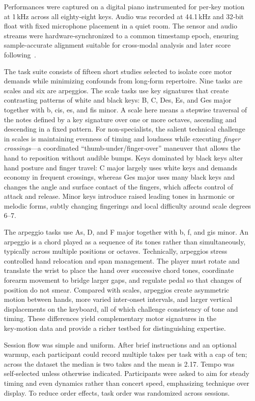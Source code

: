 \documentclass[sigconf,review,anonymous]{acmart}
\begin{document}
Performances were captured on a digital piano instrumented for per‑key motion at 1\,kHz across all eighty‑eight keys. Audio was recorded at 44.1\,kHz and 32‑bit float with fixed microphone placement in a quiet room. The sensor and audio streams were hardware‑synchronized to a common timestamp epoch, ensuring sample‑accurate alignment suitable for cross‑modal analysis and later score following~\cite{nakamura2016}.

The task suite consists of fifteen short studies selected to isolate core motor demands while minimizing confounds from long‑form repertoire. Nine tasks are scales and six are arpeggios. The scale tasks use key signatures that create contrasting patterns of white and black keys: B, C, Des, Es, and Ges major together with b, cis, es, and fis minor. A scale here means a stepwise traversal of the notes defined by a key signature over one or more octaves, ascending and descending in a fixed pattern. For non‑specialists, the salient technical challenge in scales is maintaining evenness of timing and loudness while executing \emph{finger crossings}—a coordinated “thumb‑under/finger‑over” maneuver that allows the hand to reposition without audible bumps. Keys dominated by black keys alter hand posture and finger travel: C major largely uses white keys and demands economy in frequent crossings, whereas Ges major uses many black keys and changes the angle and surface contact of the fingers, which affects control of attack and release. Minor keys introduce raised leading tones in harmonic or melodic forms, subtly changing fingerings and local difficulty around scale degrees 6–7.

The arpeggio tasks use As, D, and F major together with b, f, and gis minor. An arpeggio is a chord played as a sequence of its tones rather than simultaneously, typically across multiple positions or octaves. Technically, arpeggios stress controlled hand relocation and span management. The player must rotate and translate the wrist to place the hand over successive chord tones, coordinate forearm movement to bridge larger gaps, and regulate pedal so that changes of position do not smear. Compared with scales, arpeggios create asymmetric motion between hands, more varied inter‑onset intervals, and larger vertical displacements on the keyboard, all of which challenge consistency of tone and timing. These differences yield complementary motor signatures in the key‑motion data and provide a richer testbed for distinguishing expertise.

Session flow was simple and uniform. After brief instructions and an optional warmup, each participant could record multiple takes per task with a cap of ten; across the dataset the median is two takes and the mean is 2.17. Tempo was self‑selected unless otherwise indicated. Participants were asked to aim for steady timing and even dynamics rather than concert speed, emphasizing technique over display. To reduce order effects, task order was randomized across sessions.
\end{document}
